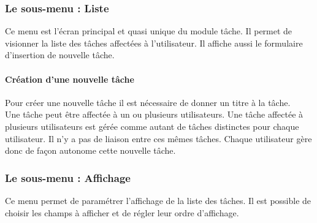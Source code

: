 \subsubsection{Le sous-menu : Liste}

Ce menu est l'écran principal et quasi unique du module tâche.
Il permet de visionner la liste des tâches affectées à l'utilisateur.
Il affiche aussi le formulaire d'insertion de nouvelle tâche.\\

\paragraph{Création d'une nouvelle tâche}

Pour créer une nouvelle tâche il est nécessaire de donner un titre à la tâche.\\

Une tâche peut être affectée à un ou plusieurs utilisateurs.
Une tâche affectée à plusieurs utilisateurs est gérée comme autant de tâches distinctes pour chaque utilisateur. Il n'y a pas de liaison entre ces mêmes tâches.
Chaque utilisateur gère donc de façon autonome cette nouvelle tâche.


\subsubsection{Le sous-menu : Affichage}

Ce menu permet de paramétrer l'affichage de la liste des tâches. Il est possible de choisir les champs à afficher et de régler leur ordre d'affichage.
